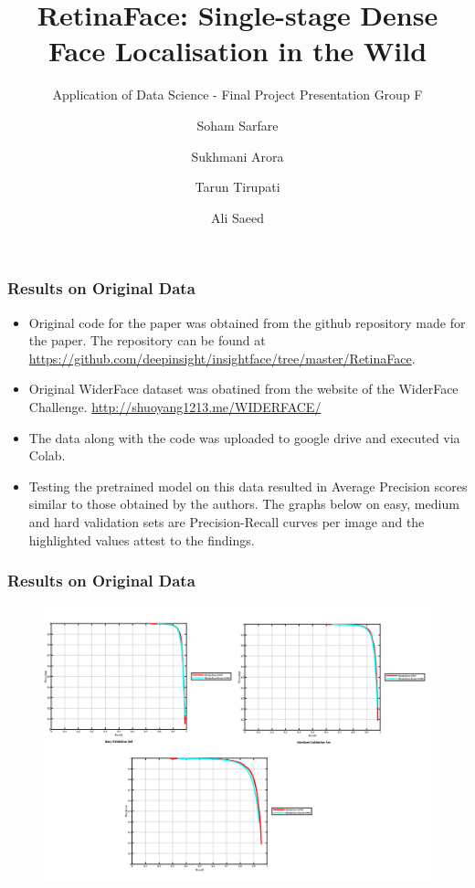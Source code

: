 \documentclass[11pt]{beamer}
\begin{document}
	\author[Soham, Sukhmani, Tarun, Ali]{Soham Sarfare \and Sukhmani Arora \and Tarun Tirupati \and Ali Saeed}
	\title[RetinaFace]{ RetinaFace: Single-stage Dense Face Localisation in the Wild}
	\subtitle{Application of Data Science - Final Project Presentation Group F}
	\begin{frame}[plain]
		\maketitle
	\end{frame}
	\begin{frame}
		\frametitle{Results on Original Data}
		\begin{itemize}
			\item Original code for the paper was obtained from the github repository made for the paper. The repository can be found at \url{https://github.com/deepinsight/insightface/tree/master/RetinaFace}. 
			\item Original WiderFace dataset was obatined from the website of the WiderFace Challenge. \url{http://shuoyang1213.me/WIDERFACE/} 
			\item The data along with the code was uploaded to google drive and executed via Colab.
			\item Testing the pretrained model on this data resulted in Average Precision scores similar to those obtained by the authors. The graphs below on easy, medium and hard validation sets are Precision-Recall curves per image and the highlighted values attest to the findings. 			
		\end{itemize}
	\end{frame}
\begin{frame}
	\frametitle{Results on Original Data}
	\begin{figure}
\includegraphics[height=8cm]{final_out.png}
		\end{figure}
	\end{frame}
\end{document}
